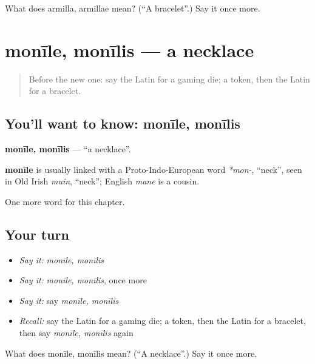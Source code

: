 \begin{tcolorbox}[breakable,colback=teal!4,colframe=teal!35!black,title={Before you move on}]
What does armilla, armillae mean? (\textquotedblleft{}A bracelet\textquotedblright{}.) Say it once more.
\end{tcolorbox}
\section[monīle, monīlis]{monīle, monīlis — a necklace}

\label{lesson:LA-C193-monile}



\begin{quote}
Before the new one: say the Latin for a gaming die; a token, then the Latin for a bracelet.
\end{quote}

\subsection*{You'll want to know: monīle, monīlis}
\textbf{monīle, monīlis} — \textquotedblleft{}a necklace\textquotedblright{}.

\begin{cousinweb}
\textbf{monīle} is usually linked with a Proto-Indo-European word \emph{*mon-}, \textquotedblleft{}neck\textquotedblright{}, seen in Old Irish \emph{muin}, \textquotedblleft{}neck\textquotedblright{}; English \emph{mane} is a cousin.
\end{cousinweb}

\begin{grammarlens}[title={What you've built}]
One more word for this chapter.
\end{grammarlens}

\subsection*{Your turn}
\begin{itemize}
\raggedright
  \item \emph{Say it:} \emph{monīle, monīlis}
  \item \emph{Say it:} \emph{monīle, monīlis}, once more
  \item \emph{Say it:} say \emph{monīle, monīlis}
  \item \emph{Recall:} say the Latin for a gaming die; a token, then the Latin for a bracelet, then say \emph{monīle, monīlis} again
\end{itemize}

\begin{tcolorbox}[breakable,colback=teal!4,colframe=teal!35!black,title={Before you move on}]
What does monīle, monīlis mean? (\textquotedblleft{}A necklace\textquotedblright{}.) Say it once more.
\end{tcolorbox}
